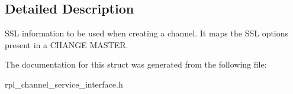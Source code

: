 \subsection{Detailed Description}
S\+SL information to be used when creating a channel. It maps the S\+SL options present in a C\+H\+A\+N\+GE M\+A\+S\+T\+ER. 

The documentation for this struct was generated from the following file\+:\begin{DoxyCompactItemize}
\item 
rpl\+\_\+channel\+\_\+service\+\_\+interface.\+h\end{DoxyCompactItemize}
